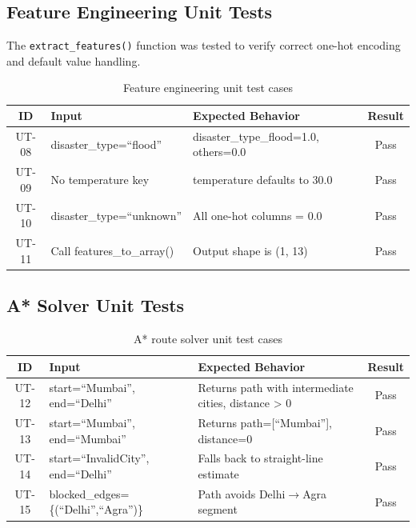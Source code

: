 \subsection{Feature Engineering Unit Tests}

The \texttt{extract\_features()} function was tested to verify correct one-hot encoding and default value handling.

\begin{table}[H]
\centering
\caption{Feature engineering unit test cases}
\label{tab:unit_features}
\begin{tabularx}{\textwidth}{|c|X|X|c|}
\hline
\textbf{ID} & \textbf{Input} & \textbf{Expected Behavior} & \textbf{Result} \\
\hline
UT-08 & disaster\_type=``flood'' & disaster\_type\_flood=1.0, others=0.0 & Pass \\
\hline
UT-09 & No temperature key & temperature defaults to 30.0 & Pass \\
\hline
UT-10 & disaster\_type=``unknown'' & All one-hot columns = 0.0 & Pass \\
\hline
UT-11 & Call features\_to\_array() & Output shape is (1, 13) & Pass \\
\hline
\end{tabularx}
\end{table}

\subsection{A* Solver Unit Tests}

\begin{table}[H]
\centering
\caption{A* route solver unit test cases}
\label{tab:unit_astar}
\begin{tabularx}{\textwidth}{|c|X|X|c|}
\hline
\textbf{ID} & \textbf{Input} & \textbf{Expected Behavior} & \textbf{Result} \\
\hline
UT-12 & start=``Mumbai'', end=``Delhi'' & Returns path with intermediate cities, distance > 0 & Pass \\
\hline
UT-13 & start=``Mumbai'', end=``Mumbai'' & Returns path=[``Mumbai''], distance=0 & Pass \\
\hline
UT-14 & start=``InvalidCity'', end=``Delhi'' & Falls back to straight-line estimate & Pass \\
\hline
UT-15 & blocked\_edges=\{(``Delhi'',``Agra'')\} & Path avoids Delhi$\rightarrow$Agra segment & Pass \\
\hline
\end{tabularx}
\end{table}

